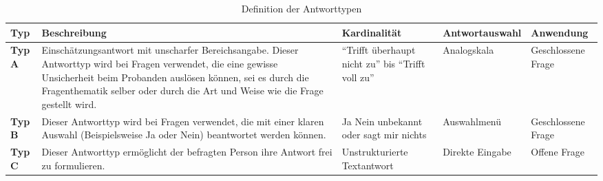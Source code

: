 \documentclass[../../main.tex]{subfiles}
\begin{document}

\sloppy 

\begin{table}[H]
\tablefontsize	
\centering
\caption{Definition der Antworttypen}
\label{Definition der Antworttypen}
\begin{tabular}{ |p{1.0cm}|p{5.0cm}|p{4cm}|p{2.5cm}|p{2.5cm}|}

\hline
\tableheaderbgcolor
\textbf{Typ} & \textbf{Beschreibung} & \textbf{Kardinalität} & \textbf{Antwortauswahl} & \textbf{Anwendung}\\ 

\hline
\textbf{Typ A} &  Einschätzungsantwort mit unscharfer Bereichsangabe. Dieser Antworttyp wird bei Fragen verwendet, die eine gewisse Unsicherheit beim Probanden auslösen können, sei es durch die Fragenthematik selber oder durch die Art und Weise wie die Frage gestellt wird. & "`Trifft überhaupt nicht zu"' \newline bis \newline "`Trifft voll zu"' & Analogskala  & Geschlossene Frage\\

\hline
\textbf{Typ B} & Dieser Antworttyp wird bei Fragen verwendet, die mit einer klaren Auswahl (Beispielsweise Ja oder Nein) beantwortet werden können. & Ja \newline Nein \newline unbekannt oder sagt mir nichts & Auswahlmenü & Geschlossene Frage\\

\hline
\textbf{Typ C} &  Dieser Antworttyp ermöglicht der befragten Person ihre Antwort frei zu formulieren. &  Unstrukturierte Textantwort & Direkte Eingabe & Offene Frage\\
\hline

\end{tabular}
\end{table}



\end{document}
